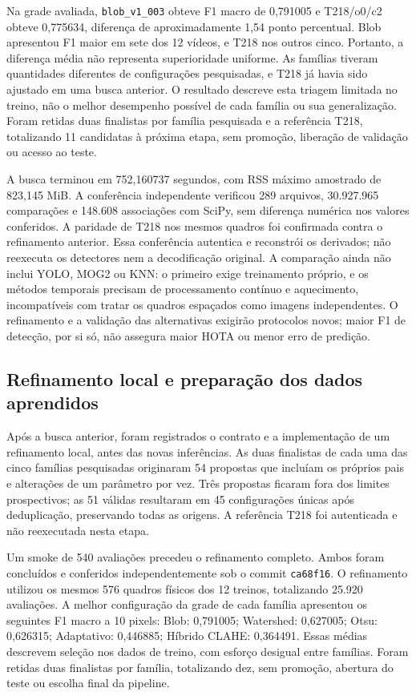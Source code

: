 Na grade avaliada, \texttt{blob\_v1\_003} obteve F1 macro de 0,791005 e T218/o0/c2 obteve 0,775634, diferença de aproximadamente 1,54 ponto percentual. Blob apresentou F1 maior em sete dos 12 vídeos, e T218 nos outros cinco. Portanto, a diferença média não representa superioridade uniforme. As famílias tiveram quantidades diferentes de configurações pesquisadas, e T218 já havia sido ajustado em uma busca anterior. O resultado descreve esta triagem limitada no treino, não o melhor desempenho possível de cada família ou sua generalização. Foram retidas duas finalistas por família pesquisada e a referência T218, totalizando 11 candidatas à próxima etapa, sem promoção, liberação de validação ou acesso ao teste.

A busca terminou em 752,160737 segundos, com RSS máximo amostrado de 823,145 MiB. A conferência independente verificou 289 arquivos, 30.927.965 comparações e 148.608 associações com SciPy, sem diferença numérica nos valores conferidos. A paridade de T218 nos mesmos quadros foi confirmada contra o refinamento anterior. Essa conferência autentica e reconstrói os derivados; não reexecuta os detectores nem a decodificação original. A comparação ainda não inclui YOLO, MOG2 ou KNN: o primeiro exige treinamento próprio, e os métodos temporais precisam de processamento contínuo e aquecimento, incompatíveis com tratar os quadros espaçados como imagens independentes. O refinamento e a validação das alternativas exigirão protocolos novos; maior F1 de detecção, por si só, não assegura maior HOTA ou menor erro de predição.


\subsection{Refinamento local e preparação dos dados aprendidos}
\label{sec:refinamento-classicos-20260911}

Após a busca anterior, foram registrados o contrato e a implementação de um refinamento local, antes das novas inferências. As duas finalistas de cada uma das cinco famílias pesquisadas originaram 54 propostas que incluíam os próprios pais e alterações de um parâmetro por vez. Três propostas ficaram fora dos limites prospectivos; as 51 válidas resultaram em 45 configurações únicas após deduplicação, preservando todas as origens. A referência T218 foi autenticada e não reexecutada nesta etapa.

Um smoke de 540 avaliações precedeu o refinamento completo. Ambos foram concluídos e conferidos independentemente sob o commit \texttt{ca68f16}. O refinamento utilizou os mesmos 576 quadros físicos dos 12 treinos, totalizando 25.920 avaliações. A melhor configuração da grade de cada família apresentou os seguintes F1 macro a 10 pixels: Blob: 0,791005; Watershed: 0,627005; Otsu: 0,626315; Adaptativo: 0,446885; Híbrido CLAHE: 0,364491. Essas médias descrevem seleção nos dados de treino, com esforço desigual entre famílias. Foram retidas duas finalistas por família, totalizando dez, sem promoção, abertura do teste ou escolha final da pipeline.

